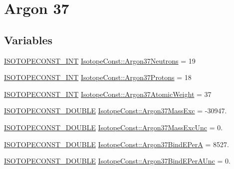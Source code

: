 \hypertarget{group___isotope_const-_argon-_ar37}{}\section{Argon 37}
\label{group___isotope_const-_argon-_ar37}
\subsection*{Variables}
\begin{DoxyCompactItemize}
\item 
\mbox{\hyperlink{group___isotope_const-_macros_ga5f18360b3e99483a35c32d789e62621c}{I\+S\+O\+T\+O\+P\+E\+C\+O\+N\+S\+T\+\_\+\+I\+NT}} \mbox{\hyperlink{group___isotope_const-_argon-_ar37_ga627048cc9230f0463569ca03c902e35f}{Isotope\+Const\+::\+Argon37\+Neutrons}} = 19
\item 
\mbox{\hyperlink{group___isotope_const-_macros_ga5f18360b3e99483a35c32d789e62621c}{I\+S\+O\+T\+O\+P\+E\+C\+O\+N\+S\+T\+\_\+\+I\+NT}} \mbox{\hyperlink{group___isotope_const-_argon-_ar37_ga0f7a5fe794c85dbfb364e262bef03a20}{Isotope\+Const\+::\+Argon37\+Protons}} = 18
\item 
\mbox{\hyperlink{group___isotope_const-_macros_ga5f18360b3e99483a35c32d789e62621c}{I\+S\+O\+T\+O\+P\+E\+C\+O\+N\+S\+T\+\_\+\+I\+NT}} \mbox{\hyperlink{group___isotope_const-_argon-_ar37_ga503edef1d754bc66a9adc20fc96fa585}{Isotope\+Const\+::\+Argon37\+Atomic\+Weight}} = 37
\item 
\mbox{\hyperlink{group___isotope_const-_macros_ga8f45a7272ce02c0b4c65c44636ed719a}{I\+S\+O\+T\+O\+P\+E\+C\+O\+N\+S\+T\+\_\+\+D\+O\+U\+B\+LE}} \mbox{\hyperlink{group___isotope_const-_argon-_ar37_ga057d365de89237d64218f381c52cf889}{Isotope\+Const\+::\+Argon37\+Mass\+Exc}} = -\/30947.
\item 
\mbox{\hyperlink{group___isotope_const-_macros_ga8f45a7272ce02c0b4c65c44636ed719a}{I\+S\+O\+T\+O\+P\+E\+C\+O\+N\+S\+T\+\_\+\+D\+O\+U\+B\+LE}} \mbox{\hyperlink{group___isotope_const-_argon-_ar37_gadb26c365b01b9d3883c2ee64654293e2}{Isotope\+Const\+::\+Argon37\+Mass\+Exc\+Unc}} = 0.
\item 
\mbox{\hyperlink{group___isotope_const-_macros_ga8f45a7272ce02c0b4c65c44636ed719a}{I\+S\+O\+T\+O\+P\+E\+C\+O\+N\+S\+T\+\_\+\+D\+O\+U\+B\+LE}} \mbox{\hyperlink{group___isotope_const-_argon-_ar37_ga23c7bcb97962182a63772fdcdca83f81}{Isotope\+Const\+::\+Argon37\+Bind\+E\+PerA}} = 8527.
\item 
\mbox{\hyperlink{group___isotope_const-_macros_ga8f45a7272ce02c0b4c65c44636ed719a}{I\+S\+O\+T\+O\+P\+E\+C\+O\+N\+S\+T\+\_\+\+D\+O\+U\+B\+LE}} \mbox{\hyperlink{group___isotope_const-_argon-_ar37_gacded8c899ea62428fec5420ecbd4f629}{Isotope\+Const\+::\+Argon37\+Bind\+E\+Per\+A\+Unc}} = 0.

\end{DoxyCompactItemize}
